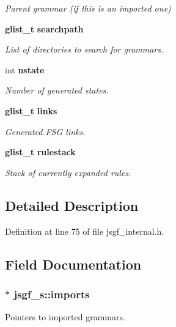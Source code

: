 \begin{DoxyCompactItemize}
\begin{DoxyCompactList}\small\item\em Parent grammar (if this is an imported one) \end{DoxyCompactList}\item 
{\bf glist\-\_\-t} {\bf searchpath}
\begin{DoxyCompactList}\small\item\em List of directories to search for grammars. \end{DoxyCompactList}\item 
int {\bf nstate}
\begin{DoxyCompactList}\small\item\em Number of generated states. \end{DoxyCompactList}\item 
{\bf glist\-\_\-t} {\bf links}
\begin{DoxyCompactList}\small\item\em Generated F\-S\-G links. \end{DoxyCompactList}\item 
{\bf glist\-\_\-t} {\bf rulestack}
\begin{DoxyCompactList}\small\item\em Stack of currently expanded rules. \end{DoxyCompactList}\end{DoxyCompactItemize}


\subsection{Detailed Description}


Definition at line 75 of file jsgf\-\_\-internal.\-h.



\subsection{Field Documentation}
\subsubsection[{imports}]{$\ast$ jsgf\-\_\-s\-::imports}\label{structjsgf__s_a7efd071684d4ef7f077b0b06ce7bbc78}


Pointers to imported grammars. 



